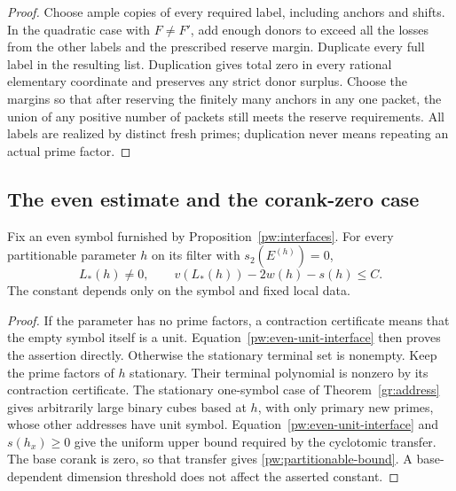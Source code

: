 \begin{proof}
Choose ample copies of every required label, including anchors and shifts.
In the quadratic case with \(F\ne F'\), add enough donors to exceed
all the losses from the
other labels and the prescribed reserve margin.  Duplicate every full
label in the resulting list.  Duplication gives total zero in every
rational elementary coordinate and preserves any strict donor surplus.
Choose the margins so that after reserving the finitely many anchors in
any one packet, the union of any positive number of packets still meets
the reserve requirements.  All labels are realized by distinct fresh
primes; duplication never means repeating an actual prime factor.
\end{proof}

\subsection{The even estimate and the corank-zero case}
\label{pw:lower-section}

\begin{proposition}\label{pw:partitionable-even}
Fix an even symbol furnished by Proposition~\ref{pw:interfaces}.  For every
partitionable parameter $h$ on its filter with $s_2(E^{(h)})=0$,
\begin{equation}\label{pw:partitionable-bound}
 L_*(h)\ne0,\qquad v(L_*(h))-2w(h)-s(h)\le C.
\end{equation}
The constant depends only on the symbol and fixed local data.
\end{proposition}

\begin{proof}
If the parameter has no prime factors, a contraction certificate means
that the empty symbol itself is a unit.  Equation~\eqref{pw:even-unit-interface}
then proves the assertion directly.  Otherwise the stationary terminal
set is nonempty.
Keep the prime factors of $h$ stationary.  Their terminal polynomial is
nonzero by its contraction certificate.  The stationary one-symbol case
of Theorem~\ref{gr:address} gives arbitrarily large binary cubes based at
$h$, with only primary new primes, whose other addresses have unit symbol.
Equation~\eqref{pw:even-unit-interface} and $s(h_x)\ge0$ give the uniform
upper bound required by the cyclotomic transfer.  The base corank is zero,
so that transfer gives \eqref{pw:partitionable-bound}.  A base-dependent
dimension threshold does not affect the asserted constant.
\end{proof}

